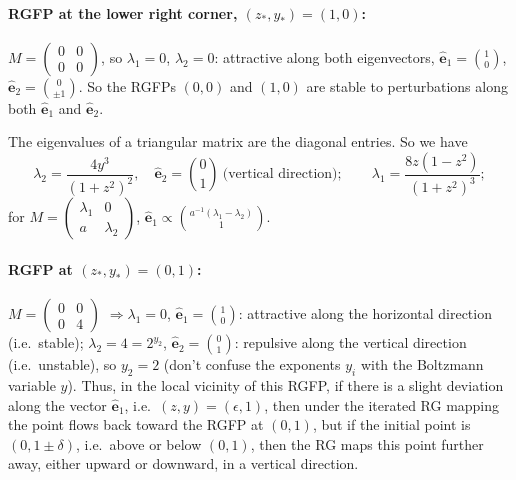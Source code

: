 \paragraph{RGFP at the lower right corner, $(z_*,y_*) = (1,0)$:}
$M = \left(\begin{smallmatrix}0&0\\0&0\end{smallmatrix}\right)$, so $\lambda_1 = 0$, $\lambda_2 = 0$: attractive
along both eigenvectors, $\hat{\mathbf e}_1 = \binom10$, $\hat{\mathbf e}_2 = \binom{0}{\pm1}$. So the RGFPs
$(0,0)$ and $(1,0)$ are stable to perturbations along both $\hat{\mathbf e}_1$ and $\hat{\mathbf e}_2$.

The eigenvalues of a triangular matrix are the diagonal entries. So we have
\begin{equation}
  \lambda_2 = \frac{4y^3}{(1+z^2)^2},\quad \hat{\mathbf e}_2 = \binom01\ \text{(vertical direction)};\qquad
  \lambda_1 = \frac{8z(1-z^2)}{(1+z^2)^3};
\end{equation}
for $M = \left(\begin{smallmatrix}\lambda_1&0\\a&\lambda_2\end{smallmatrix}\right)$,
$\hat{\mathbf e}_1\propto\binom{a^{-1}(\lambda_1-\lambda_2)}{1}$.

\paragraph{RGFP at $(z_*,y_*) = (0,1)$:} $M = \left(\begin{smallmatrix}0&0\\0&4\end{smallmatrix}\right)$
$\Rightarrow\lambda_1 = 0$, $\hat{\mathbf e}_1 = \binom10$: attractive along the horizontal direction (i.e.\
stable); $\lambda_2 = 4 = 2^{y_2}$, $\hat{\mathbf e}_2 = \binom01$: repulsive along the vertical direction (i.e.\
unstable), so $y_2 = 2$ (don't confuse the exponents $y_i$ with the Boltzmann variable $y$). Thus, in the local
vicinity of this RGFP, if there is a slight deviation along the vector $\hat{\mathbf e}_1$, i.e.\
$(z,y) = (\epsilon,1)$, then under the iterated RG mapping the point flows back toward the RGFP at $(0,1)$, but
if the initial point is $(0,1\pm\delta)$, i.e.\ above or below $(0,1)$, then the RG maps this point further
away, either upward or downward, in a vertical direction.

